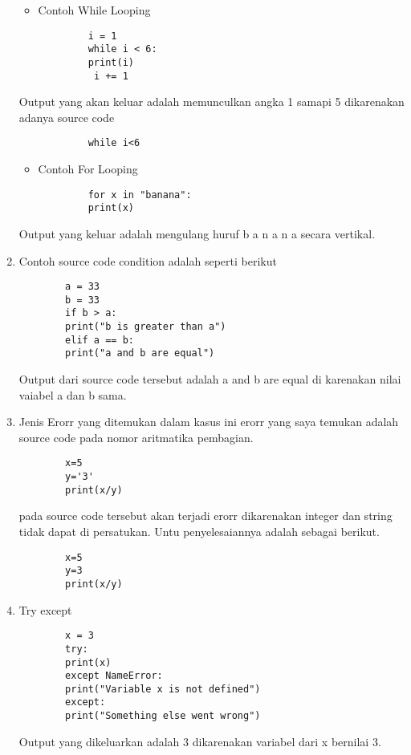 \begin{enumerate}
	\begin{itemize}
	\item Contoh While Looping
	\end{itemize}
		\begin{verbatim}
			i = 1
			while i < 6:
		  	print(i)
 			 i += 1
		\end{verbatim}
	\subitem Output yang akan keluar adalah memunculkan angka 1 samapi 5 dikarenakan adanya source code
		\begin{verbatim}
			while i<6
		\end{verbatim}
	\begin{itemize}
	\item Contoh For Looping
	\end{itemize}
		\begin{verbatim}
			for x in "banana":
			print(x)
		\end{verbatim}
	\subitem Output yang keluar adalah mengulang huruf b a n a n a secara vertikal.
\par
\item Contoh source code condition adalah seperti berikut
	\begin{verbatim}
		a = 33
		b = 33
		if b > a:
  		print("b is greater than a")
		elif a == b:
  		print("a and b are equal")
	\end{verbatim}
\subitem Output dari source code tersebut adalah a and b are equal di karenakan nilai vaiabel a dan b sama.

\par
\item Jenis Erorr yang ditemukan
\subitem dalam kasus ini erorr yang saya temukan adalah source code pada nomor aritmatika pembagian.
	\begin{verbatim}
		x=5
		y='3'
		print(x/y)
	\end{verbatim}
\subitem pada source code tersebut akan terjadi erorr dikarenakan integer dan string tidak dapat di persatukan. Untu penyelesaiannya adalah sebagai berikut.
	\begin{verbatim}
		x=5
		y=3
		print(x/y)
	\end{verbatim}
\par
\item Try except
	\begin{verbatim}
		x = 3
		try:
		print(x)
		except NameError:
		print("Variable x is not defined")
		except:
		print("Something else went wrong")
	\end{verbatim}
\subitem Output yang dikeluarkan adalah 3 dikarenakan variabel dari x bernilai 3.
\end{enumerate}

